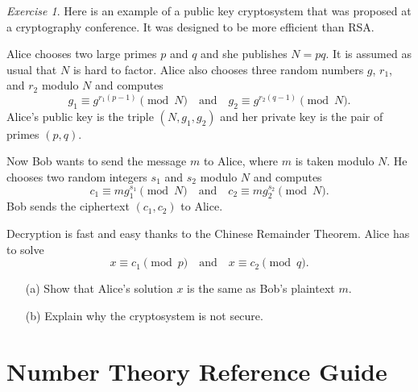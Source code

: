 \documentclass{article}
\theoremstyle{definition}
\theoremstyle{remark}
\newtheorem{exercise}{Exercise}
\begin{document}
    \begin{exercise}
        Here is an example of a public key cryptosystem that was proposed at a cryptography conference.
        It was designed to be more efficient than RSA.

        Alice chooses two large primes \(p\) and \(q\) and she publishes \(N=pq\).
        It is assumed as usual that \(N\) is hard to factor.
        Alice also chooses three random numbers \(g\), \(r_1\), and \(r_2\) modulo \(N\) and computes 
        \[g_1 \equiv g^{r_1(p-1)}\pmod{N}\quad\textrm{and}\quad g_2 \equiv g^{r_2(q-1)}\pmod{N}.\]
        Alice's public key is the triple \((N,g_1,g_2)\) and her private key is the pair of primes \((p,q)\).

        Now Bob wants to send the message \(m\) to Alice, where \(m\) is taken modulo \(N\).
        He chooses two random integers \(s_1\) and \(s_2\) modulo \(N\) and computes
        \[c_1 \equiv mg_1^{s_1}\pmod{N}\quad\textrm{and}\quad c_2 \equiv mg_2^{s_2}\pmod{N}.\]
        Bob sends the ciphertext \((c_1,c_2)\) to Alice.

        Decryption is fast and easy thanks to the Chinese Remainder Theorem.
        Alice has to solve
        \[x\equiv c_1\pmod{p}\quad\textrm{and}\quad x\equiv c_2\pmod{q}.\]

        \begin{enumerate}
            \item[(a)] Show that Alice's solution \(x\) is the same as Bob's plaintext \(m\).
            \item[(b)] Explain why the cryptosystem is not secure. 
        \end{enumerate}
    \end{exercise}
    \iffalse
    Solution:
    \begin{enumerate}
        \item[(a)] Apply Fermat's little theorem to \(c_1\equiv mg_1^{s_1}\equiv mg^{r_1s_1(p-1)}\equiv m\pmod{p}\).
        \item[(b)] By FLT, we have that \(g_1\equiv g^{r_1(p-1)}\equiv 1\pmod{p}\).
        If \(g_1\not\equiv 1\pmod{q}\), Eve computes \(\gcd(g_1-1,N)=p\) easily.
        If \(g_1\equiv 1\pmod{q}\), then \(c_1\equiv m\pmod{N}\), so she can read the message.
        Either way, Eve can recover the message.
    \end{enumerate}
    \fi

\section{Number Theory Reference Guide}
\end{document}
